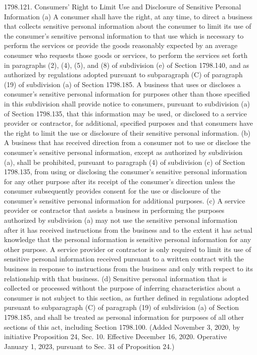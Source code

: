 1798.121.  Consumers’ Right to Limit Use and Disclosure of Sensitive Personal Information
(a) A consumer shall have the right, at any time, to direct a business that collects sensitive personal information about the consumer to limit its use of the consumer’s sensitive personal information to that use which is necessary to perform the services or provide the goods reasonably expected by an average consumer who requests those goods or services, to perform the services set forth in paragraphs (2), (4), (5), and (8) of subdivision (e) of Section 1798.140, and as authorized by regulations adopted pursuant to subparagraph (C) of paragraph (19) of subdivision (a) of Section 1798.185. A business that uses or discloses a consumer’s sensitive personal information for purposes other than those specified in this subdivision shall provide notice to consumers, pursuant to subdivision (a) of Section 1798.135, that this information may be used, or disclosed to a service provider or contractor, for additional, specified purposes and that consumers have the right to limit the use or disclosure of their sensitive personal information.
(b) A business that has received direction from a consumer not to use or disclose the consumer’s sensitive personal information, except as authorized by subdivision (a), shall be prohibited, pursuant to paragraph (4) of subdivision (c) of Section 1798.135, from using or disclosing the consumer’s sensitive personal information for any other purpose after its receipt of the consumer’s direction unless the consumer subsequently provides consent for the use or disclosure of the consumer’s sensitive personal information for additional purposes.
(c) A service provider or contractor that assists a business in performing the purposes authorized by subdivision (a) may not use the sensitive personal information after it has received instructions from the business and to the extent it has actual knowledge that the personal information is sensitive personal information for any other purpose. A service provider or contractor is only required to limit its use of sensitive personal information received pursuant to a written contract with the business in response to instructions from the business and only with respect to its relationship with that business.
(d) Sensitive personal information that is collected or processed without the purpose of inferring characteristics about a consumer is not subject to this section, as further defined in regulations adopted pursuant to subparagraph (C) of paragraph (19) of subdivision (a) of Section 1798.185, and shall be treated as personal information for purposes of all other sections of this act, including Section 1798.100.
(Added November 3, 2020, by initiative Proposition 24, Sec. 10. Effective December 16, 2020. Operative January 1, 2023, pursuant to Sec. 31 of Proposition 24.)

